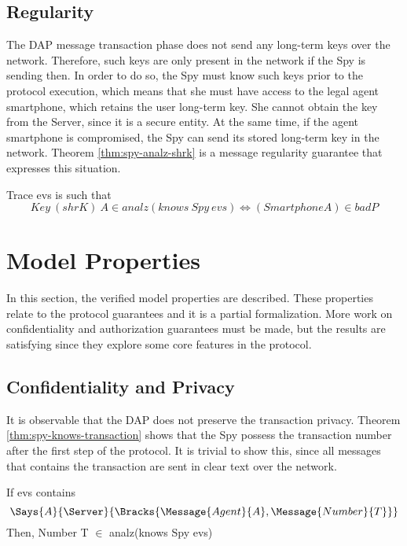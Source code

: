 \subsection{Regularity}
The DAP message transaction phase does not send any long-term keys over the network. Therefore, such keys are only present in the network if the Spy is sending then. In order to do so, the Spy must know such keys prior to the protocol execution, which means that she must have access to the legal agent smartphone, which retains the user long-term key. She cannot obtain the key from the Server, since it is a secure entity. At the same time, if the agent smartphone is compromised, the Spy can send its stored long-term key in the network. Theorem \ref{thm:spy-analz-shrk} is a message regularity guarantee that expresses this situation.

\begin{theorem}
\label{thm:spy-analz-shrk}
  Trace evs is such that \[Key\ (shrK)\ A \in analz(knows\ Spy\ evs) \Longleftrightarrow (Smartphone A) \in badP\]
\end{theorem}


\section{Model Properties}
In this section, the verified model properties are described. These properties relate to the protocol guarantees and it is a partial formalization. More work on confidentiality and authorization guarantees must be made, but the results are satisfying since they explore some core features in the protocol.



\subsection{Confidentiality and Privacy}
It is observable that the DAP does not preserve the transaction privacy. Theorem \ref{thm:spy-knows-transaction} shows that the Spy possess the transaction number after the first step of the protocol. It is trivial to show this, since all messages that contains the transaction are sent in clear text over the network.

\begin{theorem}
  \label{thm:spy-knows-transaction}
  If evs contains
  \[\Says{A}{\Server}{\Bracks{\Message{Agent}{A}, \Message{Number}{T}}}\]
  Then, Number T $\in$ analz(knows Spy evs)
\end{theorem}

